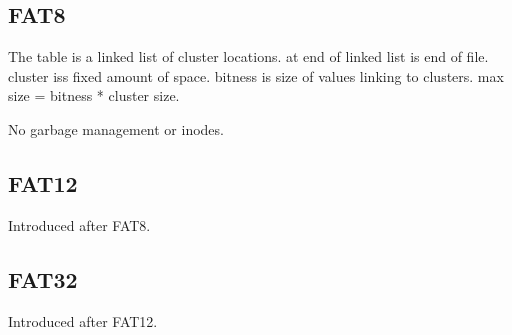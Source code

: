 
\subsection{FAT8}

The table is a linked list of cluster locations. at end of linked list is end of file. cluster iss fixed amount of space. bitness is size of values linking to clusters. max size = bitness * cluster size.

No garbage management or inodes.

\subsection{FAT12}

Introduced after FAT8.

\subsection{FAT32}

Introduced after FAT12.
